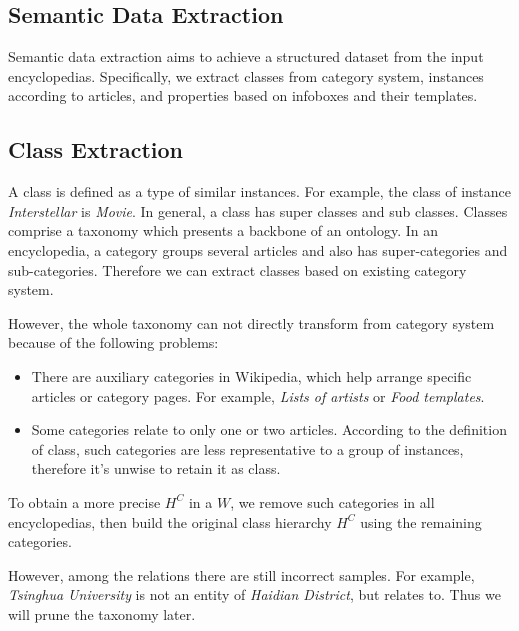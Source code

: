 \documentclass[runningheads,a4paper]{llncs}
\begin{document}
\begin{CJK*}{UTF8}{song}
\section{Semantic Data Extraction}
\label{sec:dp}
Semantic data extraction aims to achieve a structured dataset from the input encyclopedias. Specifically, we extract classes from category system, instances according to articles, and properties based on infoboxes and their templates.

\subsection{Class Extraction}
\label{sec:ce}
A class is defined as a type of similar instances. For example, the class of instance \emph{Interstellar} is \emph{Movie}. In general, a class has super classes and sub classes. Classes comprise a taxonomy which presents a backbone of an ontology. In an encyclopedia, a category groups several articles and also has super-categories and sub-categories. Therefore we can extract classes based on existing category system.

However, the whole taxonomy can not directly transform from category system because of the following problems:
\begin{itemize}
    \item There are auxiliary categories in Wikipedia, which help arrange specific articles or category pages. For example, \emph{Lists of artists} or \emph{Food templates}.
    \item Some categories relate to only one or two articles. According to the definition of class, such categories are less representative to a group of instances, therefore it's unwise to retain it as class.
\end{itemize}

To obtain a more precise $H^C$ in a $W$, we remove such categories in all encyclopedias, then build the original class hierarchy $H^C$ using the remaining categories.

However, among the relations there are still incorrect samples. For example, \emph{Tsinghua University} is not an entity of \emph{Haidian District}, but relates to. Thus we will prune the taxonomy later.


\end{CJK*}
\end{document}
